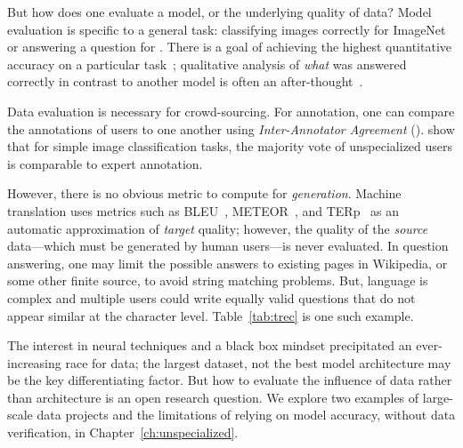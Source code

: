 But how does one evaluate a model, or the underlying quality of data?
%
Model evaluation is specific to a general task: classifying images correctly for ImageNet or answering a question for \squad{}.  
%
There is a goal of achieving the highest quantitative accuracy on a particular task~\citep{wang2019superglue}; qualitative analysis of \textit{what} was answered correctly  in contrast to another model is often an after-thought~\citep{linzen2020can}.    

Data evaluation is necessary for crowd-sourcing.  
%
For annotation, one can compare the annotations of users to one another using \textit{Inter-Annotator Agreement} (\iaa{}).
%
\citet{nowak2010reliable} show that for simple image classification tasks, the majority vote of unspecialized users is comparable to expert annotation.  

However, there is no obvious metric to compute \iaa{} for \textit{generation}. 
%
Machine translation uses metrics such as BLEU~\citep{papineni2002bleu}, METEOR~\citep{banerjee2005meteor}, and TERp~\citep{snover2009ter} as an automatic approximation of \textit{target} quality; however, the quality of the \textit{source} data---which must be generated by human users---is never evaluated.
In question answering, one may limit the possible answers to existing pages in Wikipedia, or some other finite source, to avoid string matching problems.
%
But, language is complex and multiple users could write equally valid questions that do not appear similar at the character level.  
%
Table~\ref{tab:trec} is one such example.  

The interest in neural techniques and a black box mindset precipitated an ever-increasing race for data; the largest dataset, not the best model architecture may be the key differentiating factor.  
%
But how to evaluate the influence of data rather than architecture is an open research question.  
%
We explore two examples of large-scale data projects and the limitations of relying on model accuracy, without data verification, in Chapter~\ref{ch:unspecialized}.